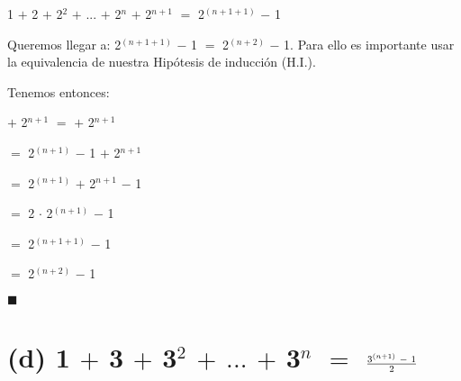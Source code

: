 \documentclass[12pt]{article}
\renewcommand{\qedsymbol}{$\blacksquare$}
\begin{document}
\hspace{2cm} 1 $+$ 2 $+$ 2$^{2}$ $+$ $...$ $+$ 2$^{n}$ $+$ 2$^{n+1}$ $=$ 2$^{(n + 1 + 1)}$ $-$ 1 \vspace{0.2cm} 

Queremos llegar a: 2$^{(n + 1 + 1)}$ $-$ 1 $=$ 2$^{(n + 2)}$ $-$ 1. Para ello es importante usar la equivalencia de nuestra  {\textcolor{verde_manzana}{Hipótesis de inducción (H.I.). }}  \vspace{0.2cm}

Tenemos entonces: \vspace{0.5cm}

\hspace{1cm} {\textcolor{verde_manzana}{}} $+$ 2$^{n+1}$ $=$ {\textcolor{verde_manzana}{}} $+$ 2$^{n+1}$ \vspace{0.2cm}

\hspace{7.7cm} $=$ 2$^{(n+1)}$ $-$ 1 $+$ 2$^{n+1}$ \vspace{0.2cm}

\hspace{7.7cm} $=$ 2$^{(n+1)}$ $+$ 2$^{n+1}$ $-$ 1  \vspace{0.2cm}

\hspace{7.7cm} $=$ 2 $\cdot$ 2$^{(n+1)}$ $-$ 1  \vspace{0.2cm}

\hspace{7.7cm} $=$ 2$^{(n+1+1)}$ $-$ 1  \vspace{0.2cm}

\hspace{7.7cm} $=$ 2$^{(n+2)}$ $-$ 1  \vspace{0.2cm}
 
\hspace{8cm} \qedsymbol \vspace{0.5cm}


\section*{(d) 1 $+$ 3 $+$ 3$^{2}$ $+$ $...$ $+$ 3$^{n}$ $=$ {\LARGE{{$\frac{3^{(n+1)} \hspace{0.1cm} - \hspace{0.1cm} 1}{2}$}}}} 
\end{document}
